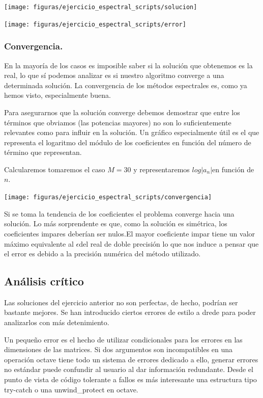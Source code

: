 \begin{center}
\texttt{[image: figuras/ejercicio\_espectral\_scripts/solucion]}

\texttt{[image: figuras/ejercicio\_espectral\_scripts/error]}
\end{center}

\lyxline{\normalsize}


\subsubsection{Convergencia.}

En la mayoría de los casos es imposible saber si la solución que obtenemos
es la real, lo que sí podemos analizar es si nuestro algoritmo converge
a una determinada solución. La convergencia de los métodos espectrales
es, como ya hemos visto, especialmente buena.

Para asegurarnos que la solución converge debemos demostrar que entre
los términos que obviamos (las potencias mayores) no son lo suficientemente
relevantes como para influir en la solución. Un gráfico especialmente
útil es el que representa el logaritmo del módulo de los coeficientes
en función del número de término que representan.

Calcularemos tomaremos el caso $M=30$ y representaremos $log|a_{n}|$en
función de $n$.
\begin{center}
\texttt{[image: figuras/ejercicio\_espectral\_scripts/convergencia]}
\end{center}

Si se toma la tendencia de los coeficientes el problema converge hacia
una solución. Lo más sorprendente es que, como la solución es simétrica,
los coeficientes impares deberían ser nulos.El mayor coeficiente impar
tiene un valor máximo equivalente al $\epsilon$del real de doble
precisión lo que nos induce a pensar que el error es debido a la precisión
numérica del método utilizado.


\subsection{Análisis crítico}

Las soluciones del ejercicio anterior no son perfectas, de hecho,
podrían ser bastante mejores. Se han introducido ciertos errores de
estilo a drede para poder analizarlos con más detenimiento.

Un pequeño error es el hecho de utilizar condicionales para los errores
en las dimensiones de las matrices. Si dos argumentos son incompatibles
en una operación octave tiene todo un sistema de errores dedicado
a ello, generar errores no estándar puede confundir al usuario al
dar información redundante. Desde el punto de vista de código tolerante
a fallos es más interesante una estructura tipo try-catch o una unwind\_protect
en octave.

